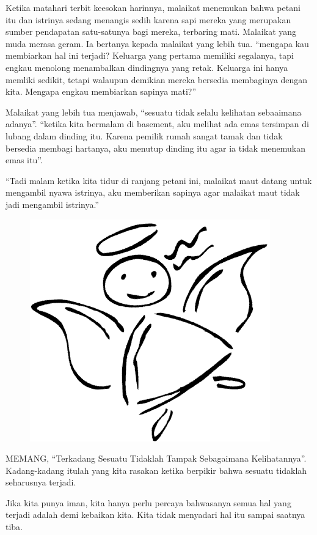 Ketika matahari terbit keesokan harinnya, malaikat menemukan bahwa petani itu dan istrinya sedang menangis sedih karena sapi mereka yang merupakan sumber pendapatan satu-satunya bagi mereka, terbaring mati. Malaikat yang muda merasa geram. Ia bertanya kepada malaikat yang lebih tua.
``mengapa kau membiarkan hal ini terjadi? Keluarga yang pertama memiliki segalanya, tapi engkau menolong menambalkan dindingnya yang retak. Keluarga ini hanya memliki sedikit, tetapi walaupun demikian mereka bersedia membaginya dengan kita. Mengapa engkau membiarkan sapinya mati?''

Malaikat yang lebih tua menjawab, ``sesuatu tidak selalu kelihatan sebaaimana adanya''.
``ketika kita bermalam di basement, aku melihat ada emas tersimpan di lubang dalam dinding itu. Karena pemilik rumah sangat tamak dan tidak bersedia membagi hartanya, aku menutup dinding itu agar ia tidak menemukan emas itu''.

 ``Tadi malam ketika kita tidur di ranjang petani ini, malaikat maut datang untuk mengambil nyawa istrinya, aku memberikan sapinya agar malaikat maut tidak jadi mengambil istrinya.''

\begin{figure}
\centering
\includegraphics[scale=0.09]{gambar/malaikat2.png}
\end{figure}

MEMANG, ``Terkadang Sesuatu Tidaklah Tampak Sebagaimana Kelihatannya''. Kadang-kadang itulah yang kita rasakan ketika berpikir bahwa sesuatu tidaklah seharusnya terjadi.

Jika kita punya iman, kita hanya perlu percaya bahwasanya semua hal yang terjadi adalah demi kebaikan kita. Kita tidak menyadari hal itu sampai saatnya tiba.

\normalsize